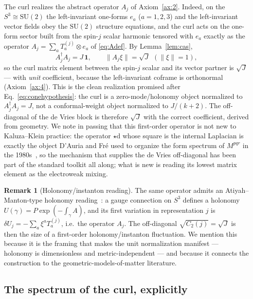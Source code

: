 \documentclass[11pt]{article}
\theoremstyle{plain}
\theoremstyle{definition}
\newtheorem{remark}[theorem]{Remark}
\newcommand{\dd}{\mathrm{d}}
\newcommand{\SU}{\mathrm{SU}}
\begin{document}
The curl realizes the abstract operator $A_j$ of Axiom~\ref{ax:2}. Indeed,
on the $S^3\cong\SU(2)$ the left-invariant one-forms $e_a$ ($a=1,2,3$) and
the left-invariant vector fields obey the $\SU(2)$ structure equations, and
the curl acts on the one-form sector built from the spin-$j$ scalar
harmonic tensored with $e_a$ exactly as the operator
$A_j=\sum_a T_a^{(j)}\otimes e_a$ of \eqref{eq:Adef}. By Lemma~\ref{lem:cas},
\begin{equation}
A_j^{\dagger}A_j=J\,\bm1,\qquad \|A_j\xi\|=\sqrt J\ \ (\|\xi\|=1),
\end{equation}
so the curl matrix element between the spin-$j$ scalar and its vector
partner is $\sqrt J$ --- with \emph{unit} coefficient, because the
left-invariant coframe is orthonormal (Axiom~\ref{ax:4}). This is the clean
realization promised after Eq.~\eqref{eq:conehypothesis}: the curl is a
zero-mode/holonomy object normalized to $A_j^\dagger A_j=J$, not a
conformal-weight object normalized to $J/(k+2)$. The off-diagonal of the de
Vries block is therefore $\sqrt J$ with the correct coefficient, derived
from geometry. We note in passing that this first-order operator is not new
to Kaluza--Klein practice: the operator $\star\dd$ whose square is the
internal Laplacian is exactly the object D'Auria and Fr\'e used to organize
the form spectrum of $M^{pqr}$ in the 1980s~\cite{CastellaniDAuriaFre}, so
the mechanism that supplies the de Vries off-diagonal has been part of the
standard toolkit all along; what is new is reading its lowest matrix element
as the electroweak mixing.

\begin{remark}[Holonomy/instanton reading]
The same operator admits an Atiyah--Manton-type holonomy
reading~\cite{AtiyahMantonSchroers2011}: a gauge connection on $S^3$ defines
a holonomy $U(\gamma)=P\exp(-\!\int_\gamma A)$, and its first variation in
representation $j$ is $\delta U_j=-\sum_a\xi^aT_a^{(j)}$, i.e.\ the operator
$A_j$. The off-diagonal $\sqrt{C_2(j)}=\sqrt J$ is then the size of a
first-order holonomy/instanton fluctuation. We mention this because it is
the framing that makes the unit normalization manifest --- holonomy is
dimensionless and metric-independent --- and because it connects the
construction to the geometric-models-of-matter literature.
\end{remark}

\subsection{The spectrum of the curl, explicitly}
\label{sec:curlspectrum}
\end{document}
